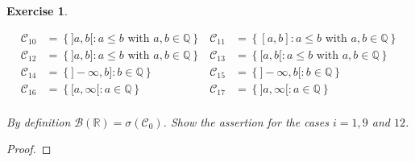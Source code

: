 \documentclass[DIV=classic,a4paper,10pt]{scrartcl}
\newtheorem{exercise}[theorem]{Exercise}
\theoremstyle{nonumberplain}
\newtheorem{proof}{Proof}
\numberwithin{equation}{section}
\begin{document}
\begin{exercise}
\begin{enumerate}[label=(\alph*), fullwidth]
\begin{align*}
                \mathcal{C}_{10}&=\left\{]a,b[\colon a\leq b \text{ with } a,b\in \mathbb{Q}\right\} & \mathcal{C}_{11}&=\left\{[a,b]\colon a\leq b \text{ with } a,b\in \mathbb{Q}\right\}\\
                \mathcal{C}_{12}&=\left\{]a,b]\colon a\leq b \text{ with } a,b\in \mathbb{Q}\right\} & \mathcal{C}_{13}&=\left\{[a,b[\colon a\leq b \text{ with } a,b\in \mathbb{Q}\right\}\\
                \mathcal{C}_{14}&=\left\{]-\infty,b]\colon b\in \mathbb{Q}\right\} & \mathcal{C}_{15}&=\left\{]-\infty,b[\colon b\in \mathbb{Q}\right\}\\
                \mathcal{C}_{16}&=\left\{[a,\infty[\colon a\in \mathbb{Q}\right\} & \mathcal{C}_{17}&=\left\{]a,\infty[\colon a\in \mathbb{Q}\right\}\\
            \end{align*}

            By definition $\mathcal{B}(\mathbb{R})=\sigma(\mathcal{C}_0)$.
            Show the assertion for the cases $i=1,9$ and $12$.
    \end{enumerate}
\end{exercise}
\begin{proof}
    
\end{proof}
\end{document}
